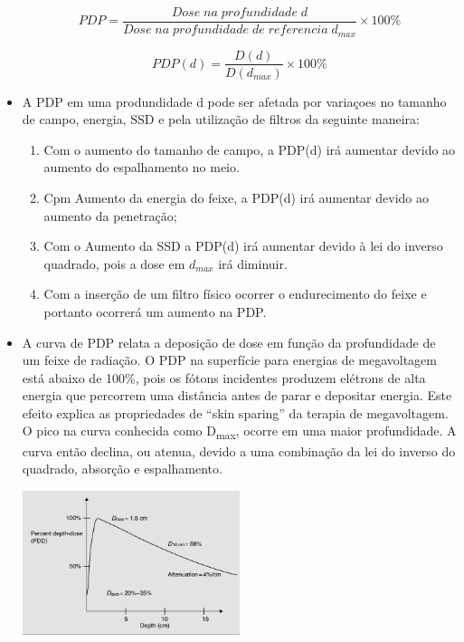 \documentclass[11pt,a4paper]{article}
\newcounter{exemplo}
\begin{document}
\begin{exemplo}
\begin{itemize}
            $$PDP = \frac{Dose\;na\;profundidade\;d}{Dose\;na\;profundidade\;de\;referencia\;d_{max}} \times 100\%$$

            $$PDP(d) = \frac{D(d)}{D(d_{max})} \times 100\%$$

        \item A PDP em uma produndidade d pode ser afetada por variaçoes no tamanho de campo, energia, SSD e pela utilização de filtros da seguinte maneira:
        
            \begin{enumerate}[label=\roman*)]
                \item Com o aumento do tamanho de campo, a PDP(d) irá aumentar devido ao aumento do espalhamento no meio.
                \item Cpm Aumento da energia do feixe, a PDP(d) irá aumentar devido ao aumento da penetração;
                \item Com o Aumento da SSD a PDP(d) irá aumentar devido à lei do inverso quadrado, pois a dose em $d_{max}$ irá diminuir.
                \item Com a inserção de um filtro físico ocorrer o endurecimento do feixe e portanto ocorrerá um aumento na PDP. 
            \end{enumerate}

        \item A curva de PDP relata a deposição de dose em função da profundidade de um feixe de radiação. O PDP na superfície para energias de megavoltagem está abaixo de 100\%, pois os fótons incidentes produzem elétrons de alta energia que percorrem uma distância antes de parar e depositar energia. Este efeito explica as propriedades de “skin sparing” da terapia de megavoltagem. O pico na curva conhecida como D\textsubscript{max}, ocorre em uma maior profundidade. A curva então declina, ou atenua, devido a uma combinação da lei do inverso do quadrado, absorção e espalhamento.
        
        \begin{center}
            \includegraphics[width=0.5\textwidth]{Imagens/pdp.JPG}
        \end{center}


\end{itemize}
\end{exemplo}
\end{document}

